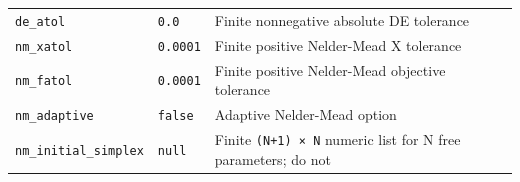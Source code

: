 \documentclass[
  10pt,
  a4paper,
  oneside]{scrreprt}
\begin{document}
\begin{longtable}[]{@{}lll@{}}
\begin{minipage}[t]{0.30\columnwidth}
\texttt{de\_atol}\strut
\end{minipage} & \begin{minipage}[t]{0.30\columnwidth}\raggedright
\texttt{0.0}\strut
\end{minipage} & \begin{minipage}[t]{0.30\columnwidth}\raggedright
Finite nonnegative absolute DE tolerance\strut
\end{minipage}\tabularnewline
\begin{minipage}[t]{0.30\columnwidth}\raggedright
\texttt{nm\_xatol}\strut
\end{minipage} & \begin{minipage}[t]{0.30\columnwidth}\raggedright
\texttt{0.0001}\strut
\end{minipage} & \begin{minipage}[t]{0.30\columnwidth}\raggedright
Finite positive Nelder-Mead X tolerance\strut
\end{minipage}\tabularnewline
\begin{minipage}[t]{0.30\columnwidth}\raggedright
\texttt{nm\_fatol}\strut
\end{minipage} & \begin{minipage}[t]{0.30\columnwidth}\raggedright
\texttt{0.0001}\strut
\end{minipage} & \begin{minipage}[t]{0.30\columnwidth}\raggedright
Finite positive Nelder-Mead objective tolerance\strut
\end{minipage}\tabularnewline
\begin{minipage}[t]{0.30\columnwidth}\raggedright
\texttt{nm\_adaptive}\strut
\end{minipage} & \begin{minipage}[t]{0.30\columnwidth}\raggedright
\texttt{false}\strut
\end{minipage} & \begin{minipage}[t]{0.30\columnwidth}\raggedright
Adaptive Nelder-Mead option\strut
\end{minipage}\tabularnewline
\begin{minipage}[t]{0.30\columnwidth}\raggedright
\texttt{nm\_initial\_simplex}\strut
\end{minipage} & \begin{minipage}[t]{0.30\columnwidth}\raggedright
\texttt{null}\strut
\end{minipage} & \begin{minipage}[t]{0.30\columnwidth}\raggedright
Finite \texttt{(N+1)\ ×\ N} numeric list for N free parameters; do not

\end{minipage}
\end{longtable}
\end{document}
